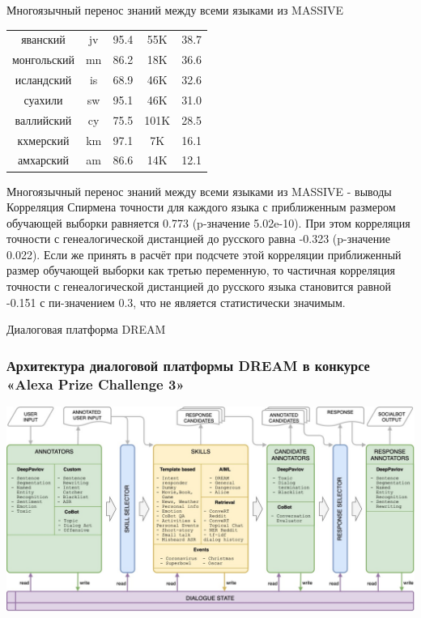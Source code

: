 \begin{frame}{Многоязычный перенос знаний между всеми языками из MASSIVE}
\begin{minipage}{0.5\textwidth}
\begin{table}[htbp]
{{\begin{tabular}[baseline={(0,2.1)}]{|c|c|c|c|c|}
яванский & jv & 95.4 & 55K & 38.7 \\
монгольский & mn & 86.2 & 18K & 36.6 \\
исландский & is & 68.9 & 46K & 32.6 \\
суахили & sw & 95.1 & 46K & 31.0 \\
валлийский & cy & 75.5 & 101K & 28.5 \\
кхмерский & km & 97.1 & 7K & 16.1 \\
амхарский & am & 86.6 & 14K & 12.1 \\ \hline
\hline
\end{tabular}
}
}
\end{table}
\end{minipage}

\end{frame}

\begin{frame}{Многоязычный перенос знаний между всеми языками из MASSIVE - выводы}
Корреляция Спирмена точности для каждого языка с приближенным размером обучающей выборки равняется 0.773 (p-значение 5.02e-10). При этом корреляция точности с генеалогической дистанцией до русского равна -0.323 (p-значение 0.022). Если же принять в расчёт при подсчете этой корреляции приближенный размер обучающей выборки как третью переменную, то частичная корреляция точности с генеалогической дистанцией до русского языка становится равной -0.151 с пи-значением 0.3, что не является статистически значимым.

\end{frame}

\begin{frame}{Диалоговая платформа DREAM}
    \frametitle{Архитектура диалоговой платформы {DREAM} в конкурсе «Alexa Prize Challenge 3»}
    \centering
    \includegraphics[width=0.8\linewidth]{images/Alexa1_.png} 
\end{frame}

